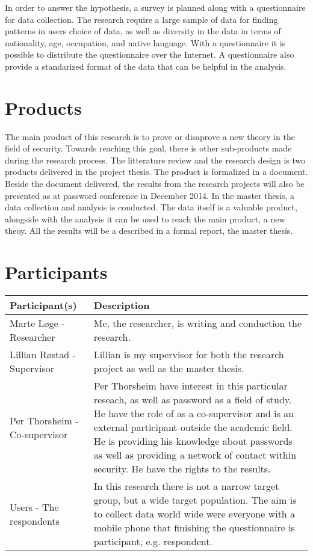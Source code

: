   In order to answer the hypothesis, a survey is planned along with a questionnaire for data collection. The research require a large sample of data for finding patterns in users choice of data, as well as diversity in the data in terms of nationality, age, occupation, and native language. With a questionnaire it is possible to distribute the questionnaire over the Internet. A questionnaire also provide a standarized format of the data that can be helpful in the analysis.  

  \section*{Products}
  The main product of this research is to prove or disaprove a new theory in the field of security. Towards reaching this goal, there is other sub-products made during the research process. The litterature review and the research design is two products delivered in the project thesis. The product is formalized in a document. Beside the document delivered, the results from the research projects will also be presented as at password conference in December 2014. In the master thesis, a data collection and analysis is conducted. The data itself is a valuable product, alongside with the analysis it can be used to reach the main product, a new theoy. All the results will be a described in a formal report, the master thesis. 

  \section*{Participants}

  \begin{table}[H]
  \begin{tabular}{| p{5cm} | p{11cm} |}
    \hline
    {\bf Participant(s)} & {\bf Description} \\ \hline
    Marte Løge - Researcher & Me, the researcher, is writing and conduction the research. \\ \hline
    Lillian Røstad - Supervisor & Lillian is my supervisor for both the research project as well as the master thesis. \\ \hline
    Per Thorsheim - Co-supervisor & Per Thorsheim have interest in this particular reseach, as well as password as a field of study. He have the role of as a co-supervisor and is an external participant outside the academic field. He is providing his knowledge about passwords as well as providing a network of contact within security. He have the rights to the results. \\ \hline
    Users - The respondents & In this research there is not a narrow target group, but a wide target population. The aim is to collect data world wide were everyone with a mobile phone that finishing the questionnaire is participant, e.g. respondent. \\ \hline
  \end{tabular}
  \end{table}


